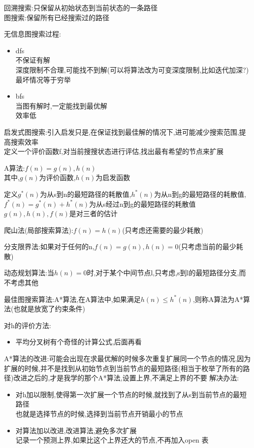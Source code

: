 \documentclass[UTF8,a4paper]{ctexart}
\begin{document}
  回溯搜索:只保留从初始状态到当前状态的一条路径\\
  图搜索:保留所有已经搜索过的路径

  无信息图搜索过程:
  \begin{itemize}
    \item dfs\\
    不保证有解\\
    深度限制不合理,可能找不到解(可以将算法改为可变深度限制,比如迭代加深?)\\
    最坏情况等于穷举\\
    \item bfs\\
    当图有解时,一定能找到最优解\\
    效率低
  \end{itemize}

  启发式图搜索:引入启发只是,在保证找到最佳解的情况下,进可能减少搜索范围,提高搜索效率\\
  定义一个评价函数f,对当前搜搜状态进行评估,找出最有希望的节点来扩展

  A算法:$f(n) = g(n) , h(n)$\\
  其中,$g(n)$为评价函数,$h(n)$为启发函数

  定义$g^*(n)$为从s到n的最短路径的耗散值,$h^*(n)$为从n到g的最短路径的耗散值,$f^*(n) = g^*(n) + h^*(n)$为从s经过n到g的最短路径的耗散值\\
  $g(n) , h(n) , f(n)$是对三者的估计

  爬山法(局部搜索算法):$f(n) = h(n)$(只考虑还需要的最少耗散)

  分支限界法:如果对于任何的n,$f(n) = g(n) , h(n) = 0$(只考虑当前的最少耗散)

  动态规划算法:当$h(n) = 0$时,对于某个中间节点l,只考虑,s到l的最短路径分支,而不考虑其他

  最佳图搜索算法:A*算法,在A算法中,如果满足$h(n) \leq h^*(n)$,则称A算法为A*算法(也就是放宽了约束条件)

  对h的评价方法:
  \begin{itemize}
    \item 平均分叉树{有个奇怪的计算公式,后面再看}
  \end{itemize}

  A*算法的改进:可能会出现在求最优解的时候多次重复扩展同一个节点的情况,因为扩展的时候,并不是找到从初始节点到当前节点的最短路径(相当于枚举了所有的路径){改进之后的,才是我学的那个A*算法,设置上界,不满足上界的不要}
  解决办法:
  \begin{itemize}
    \item 对h加以限制,使得第一次扩展一个节点的时候,就找到了从s到当前节点的最短路径\\
    也就是选择节点的时候,选择到当前节点开销最小的节点
    \item 对算法加以改进,改进算法,避免多次扩展\\
    记录一个预测上界,如果比这个上界还大的节点,不再加入open 表
  \end{itemize}
\end{document}
